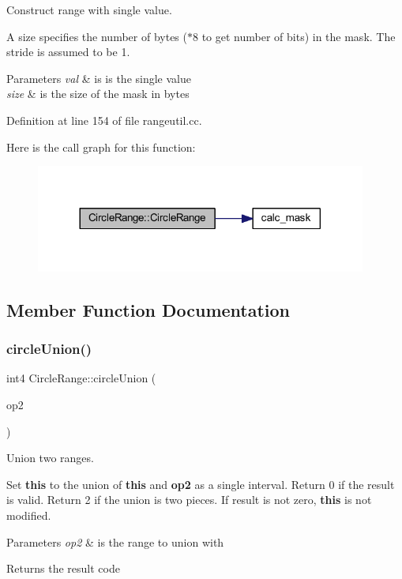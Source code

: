Construct range with single value. 

A size specifies the number of bytes ($\ast$8 to get number of bits) in the mask. The stride is assumed to be 1. 
\begin{DoxyParams}{Parameters}
{\em val} & is is the single value \\
\hline
{\em size} & is the size of the mask in bytes \\
\hline
\end{DoxyParams}


Definition at line 154 of file rangeutil.\+cc.

Here is the call graph for this function\+:
\nopagebreak
\begin{figure}[H]
\begin{center}
\leavevmode
\includegraphics[width=308pt]{class_circle_range_a7117ce750ace3935fbe5656cd7d918bb_cgraph}
\end{center}
\end{figure}


\subsection{Member Function Documentation}
\mbox{\label{class_circle_range_a286db51910f20ec7624132f8298cfe9b}} 
\subsubsection{\texorpdfstring{circleUnion()}{circleUnion()}}
{\footnotesize\ttfamily int4 Circle\+Range\+::circle\+Union (\begin{DoxyParamCaption}\item[{const \mbox{\hyperlink{class_circle_range}{Circle\+Range}} \&}]{op2 }\end{DoxyParamCaption})}



Union two ranges. 

Set {\bfseries{this}} to the union of {\bfseries{this}} and {\bfseries{op2}} as a single interval. Return 0 if the result is valid. Return 2 if the union is two pieces. If result is not zero, {\bfseries{this}} is not modified. 
\begin{DoxyParams}{Parameters}
{\em op2} & is the range to union with \\
\hline
\end{DoxyParams}
\begin{DoxyReturn}{Returns}
the result code 
\end{DoxyReturn}


